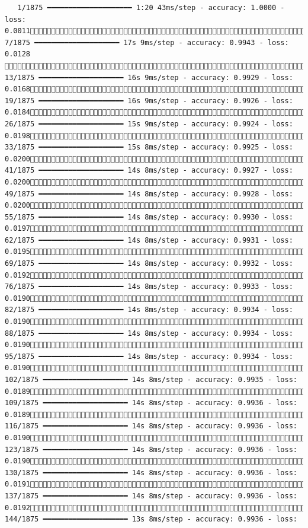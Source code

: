 \documentclass[
  letterpaper,
  DIV=11,
  numbers=noendperiod]{scrreprt}
\begin{document}
\begin{verbatim}
   1/1875 ━━━━━━━━━━━━━━━━━━━━ 1:20 43ms/step - accuracy: 1.0000 - loss: 0.0011   7/1875 ━━━━━━━━━━━━━━━━━━━━ 17s 9ms/step - accuracy: 0.9943 - loss: 0.0128    13/1875 ━━━━━━━━━━━━━━━━━━━━ 16s 9ms/step - accuracy: 0.9929 - loss: 0.0168  19/1875 ━━━━━━━━━━━━━━━━━━━━ 16s 9ms/step - accuracy: 0.9926 - loss: 0.0184  26/1875 ━━━━━━━━━━━━━━━━━━━━ 15s 9ms/step - accuracy: 0.9924 - loss: 0.0198  33/1875 ━━━━━━━━━━━━━━━━━━━━ 15s 8ms/step - accuracy: 0.9925 - loss: 0.0200  41/1875 ━━━━━━━━━━━━━━━━━━━━ 14s 8ms/step - accuracy: 0.9927 - loss: 0.0200  49/1875 ━━━━━━━━━━━━━━━━━━━━ 14s 8ms/step - accuracy: 0.9928 - loss: 0.0200  55/1875 ━━━━━━━━━━━━━━━━━━━━ 14s 8ms/step - accuracy: 0.9930 - loss: 0.0197  62/1875 ━━━━━━━━━━━━━━━━━━━━ 14s 8ms/step - accuracy: 0.9931 - loss: 0.0195  69/1875 ━━━━━━━━━━━━━━━━━━━━ 14s 8ms/step - accuracy: 0.9932 - loss: 0.0192  76/1875 ━━━━━━━━━━━━━━━━━━━━ 14s 8ms/step - accuracy: 0.9933 - loss: 0.0190  82/1875 ━━━━━━━━━━━━━━━━━━━━ 14s 8ms/step - accuracy: 0.9934 - loss: 0.0190  88/1875 ━━━━━━━━━━━━━━━━━━━━ 14s 8ms/step - accuracy: 0.9934 - loss: 0.0190  95/1875 ━━━━━━━━━━━━━━━━━━━━ 14s 8ms/step - accuracy: 0.9934 - loss: 0.0190 102/1875 ━━━━━━━━━━━━━━━━━━━━ 14s 8ms/step - accuracy: 0.9935 - loss: 0.0189 109/1875 ━━━━━━━━━━━━━━━━━━━━ 14s 8ms/step - accuracy: 0.9936 - loss: 0.0189 116/1875 ━━━━━━━━━━━━━━━━━━━━ 14s 8ms/step - accuracy: 0.9936 - loss: 0.0190 123/1875 ━━━━━━━━━━━━━━━━━━━━ 14s 8ms/step - accuracy: 0.9936 - loss: 0.0190 130/1875 ━━━━━━━━━━━━━━━━━━━━ 14s 8ms/step - accuracy: 0.9936 - loss: 0.0191 137/1875 ━━━━━━━━━━━━━━━━━━━━ 14s 8ms/step - accuracy: 0.9936 - loss: 0.0192 144/1875 ━━━━━━━━━━━━━━━━━━━━ 13s 8ms/step - accuracy: 0.9936 - loss: 
\end{verbatim}
\end{document}
